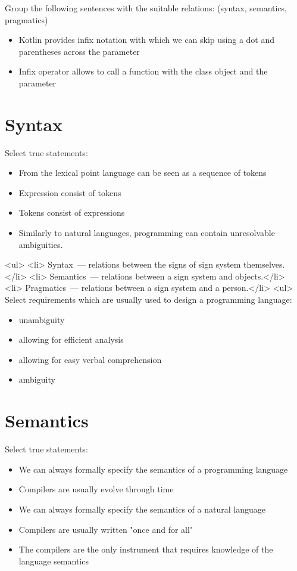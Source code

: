 

Group the following sentences with the suitable relations: (syntax, semantics, pragmatics)
\begin{itemize}
 \item Kotlin provides infix notation with which we can skip using a dot and parentheses across the parameter
 \item Infix operator allows to call a function with the class object and the parameter
\end{itemize}


\section{Syntax}

Select true statements:

\begin{itemize}
\item From the lexical point language can be seen as a sequence of tokens
\item Expression consist of tokens
\item Tokens consist of expressions
\item Similarly to natural languages, programming can contain unresolvable ambiguities.
\end{itemize}
<ul>
 <li> Syntax~--- relations between the signs of sign system themselves.</li>
 <li> Semantics~--- relations between a sign system and objects.</li>
 <li> Pragmatics~--- relations between a sign system and a person.</li>
<ul>
Select requirements which are usually used to design a programming language:
\begin{itemize}
\item unambiguity
\item allowing for efficient analysis

\item allowing for easy verbal comprehension
\item ambiguity
\end{itemize}


\section{Semantics}

Select true statements:
\begin{itemize}
\item We can always formally specify the semantics of a programming language
\item Compilers are usually evolve through time
\item We can always formally specify the semantics of a natural language
\item Compilers are usually written "once and for all"
\item The compilers are the only instrument that requires knowledge of the language semantics
\end{itemize}


